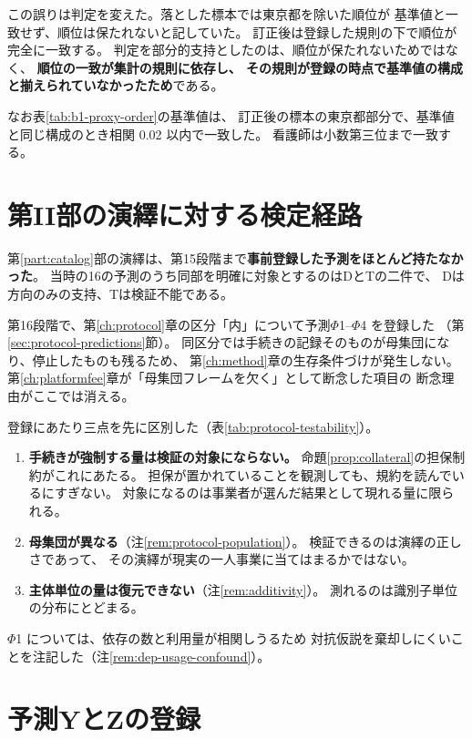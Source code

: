 この誤りは判定を変えた。落とした標本では東京都を除いた順位が
基準値と一致せず、順位は保たれないと記していた。
訂正後は登録した規則の下で順位が完全に一致する。
判定を部分的支持としたのは、順位が保たれないためではなく、
\textbf{順位の一致が集計の規則に依存し、
その規則が登録の時点で基準値の構成と揃えられていなかったため}である。

なお表\ref{tab:b1-proxy-order}の基準値は、
訂正後の標本の東京都部分で、基準値と同じ構成のとき相関 0.02 以内で一致した。
看護師は小数第三位まで一致する。

\section{第II部の演繹に対する検定経路}

第\ref{part:catalog}部の演繹は、第15段階まで\textbf{事前登録した予測をほとんど持たなかった}。
当時の16の予測のうち同部を明確に対象とするのはDとTの二件で、
Dは方向のみの支持、Tは検証不能である。

第16段階で、第\ref{ch:protocol}章の区分「内」について予測$\Phi$1--$\Phi$4 を登録した
（第\ref{sec:protocol-predictions}節）。
同区分では手続きの記録そのものが母集団になり、停止したものも残るため、
第\ref{ch:method}章の生存条件づけが発生しない。
第\ref{ch:platformfee}章が「母集団フレームを欠く」として断念した項目の
断念理由がここでは消える。

登録にあたり三点を先に区別した（表\ref{tab:protocol-testability}）。

\begin{enumerate}[label=(\arabic*)]
\item \textbf{手続きが強制する量は検証の対象にならない。}
命題\ref{prop:collateral}の担保制約がこれにあたる。
担保が置かれていることを観測しても、規約を読んでいるにすぎない。
対象になるのは事業者が選んだ結果として現れる量に限られる。

\item \textbf{母集団が異なる}（注\ref{rem:protocol-population}）。
検証できるのは演繹の正しさであって、
その演繹が現実の一人事業に当てはまるかではない。

\item \textbf{主体単位の量は復元できない}（注\ref{rem:additivity}）。
測れるのは識別子単位の分布にとどまる。
\end{enumerate}

$\Phi$1 については、依存の数と利用量が相関しうるため
対抗仮説を棄却しにくいことを注記した（注\ref{rem:dep-usage-confound}）。

\section{予測YとZの登録}

